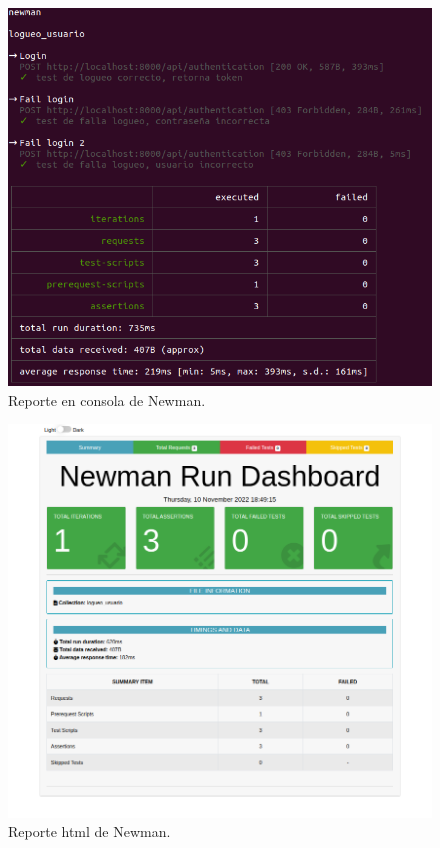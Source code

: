 \begin{figure}[ht]
	\centering
	\includegraphics[scale=.35]{./Figures/newman-1.png}
	\caption{Reporte en consola de Newman.}
	\label{fig:reporte cli Newman}
\end{figure}


\begin{figure}[ht]
	\centering
	\includegraphics[scale=.35]{./Figures/newman-2.png}
	\caption{Reporte html de Newman.}
	\label{fig:reporte html Newman}
\end{figure}

